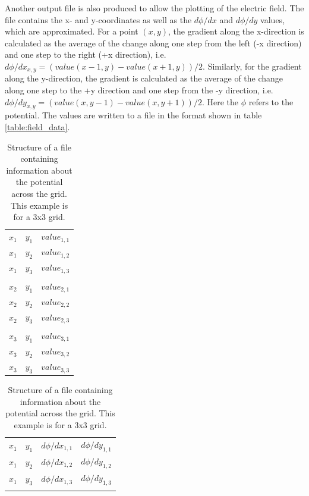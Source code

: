 \documentclass[12pt, a4paper]{article}
\begin{document}
Another output file is also produced to allow the plotting of the electric field. The file contains the x- and y-coordinates as well as the $d{\phi}/dx$ and $d{\phi}/dy$ values, which are approximated. For a point $(x,y)$, the gradient along the x-direction is calculated as the average of the change along one step from the left (-x direction) and one step to the right (+x direction), i.e. $d{\phi}/dx_{x,y} = ( value(x-1,y) - value(x+1,y) ) / 2$. Similarly, for the gradient along the y-direction, the gradient is calculated as the average of the change along one step to the +y direction and one step from the -y direction, i.e. $d{\phi}/dy_{x,y} = ( value(x,y-1) - value(x,y+1) ) / 2$. Here the $\phi$ refers to the potential. The values are written to a file in the format shown in table \ref{table:field_data}.
\begin{table}
    \parbox{0.47\linewidth}{
    \centering
    \begin{tabularx}{0.44\textwidth}{ |XXX| }
        \hline
        $x_1$ & $y_1$ & $value_{1,1}$ \\
        $x_1$ & $y_2$ & $value_{1,2}$ \\
        $x_1$ & $y_3$ & $value_{1,3}$ \\
        & & \\
        $x_2$ & $y_1$ & $value_{2,1}$ \\
        $x_2$ & $y_2$ & $value_{2,2}$ \\
        $x_2$ & $y_3$ & $value_{2,3}$ \\
        & & \\
        $x_3$ & $y_1$ & $value_{3,1}$ \\
        $x_3$ & $y_2$ & $value_{3,2}$ \\
        $x_3$ & $y_3$ & $value_{3,3}$ \\
        \hline
    \end{tabularx}
    \caption{Structure of a file containing information about the potential across the grid. This example is for a 3x3 grid.}
    \label{table:potential_data}
    }
    \hfill
    \parbox{0.47\linewidth}{
    \centering
    \begin{tabularx}{0.44\textwidth}{ |XXXX| }
        \hline
        $x_1$ & $y_1$ & $d{\phi}/dx_{1,1}$ & $d{\phi}/dy_{1,1}$ \\
        $x_1$ & $y_2$ & $d{\phi}/dx_{1,2}$ & $d{\phi}/dy_{1,2}$ \\
        $x_1$ & $y_3$ & $d{\phi}/dx_{1,3}$ & $d{\phi}/dy_{1,3}$ \\
        & & & \\

\end{tabularx}}
\end{table}
\end{document}
